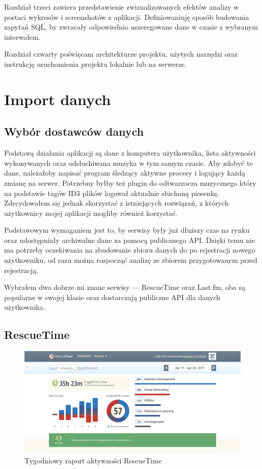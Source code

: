 \documentclass[brudnopis]{xmgr}
\begin{document}
    Rozdział trzeci zawiera przedstawienie zwizualizowanych efektów analizy w postaci wykresów i screenshotów z aplikacji.
    Definiowaniuję sposób budowania zapytań SQL, by zwracały odpowiednio uszeregowane dane w czasie z wybranym interwałem.

    Rozdział czwarty poświęcam architekturze projektu, użytych narzędzi oraz instrukcję uruchomienia projektu lokalnie lub na serwerze.

\chapter{Import danych}

    \section{Wybór dostawców danych}

    Podstawą działania aplikacji są dane z komputera użytkownika,
    lista aktywności wykonywanych oraz odsłuchiwana muzyka w tym samym czasie.
    Aby zdobyć te dane, należałoby napisać program śledzący aktywne procesy i logujący każdą zmianę na serwer.
    Potrzebny byłby też plugin do odtwarzacza muzycznego który na podstawie tagów ID3 plików logował aktualnie słuchaną piosenkę.
    Zdecydowałem się jednak skorzystać z istniejących rozwiązań, z których użytkownicy mojej aplikacji mogliby również korzystać.

    Podstawowym wymaganiem jest to, by serwisy były już dłuższy czas na rynku oraz udostępniały archiwalne dane za pomocą publicznego API.
    Dzięki temu nie ma potrzeby oczekiwania na zbudowanie zbioru danych do po rejestracji nowego użytkowniku,
    od razu można rozpocząć analizę ze zbiorem przygotowanym przed rejestracją.

    Wybrałem dwa dobrze mi znane serwisy --- RescueTime oraz Last.fm,
    oba są popularne w swojej klasie oraz dostarczają publiczne API dla danych użytkownika.

        \section*{RescueTime}

        \begin{figure}
          \includegraphics[width=\linewidth]{fig/rescuetime-dashboard.png}
          \caption{Tygodniowy raport aktywności RescueTime}
          \label{fig:RescueTime}
        \end{figure}
\end{document}
